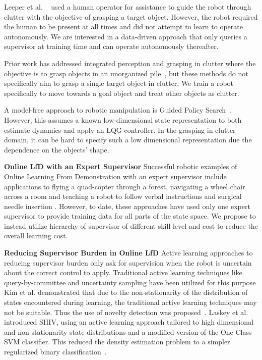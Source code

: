 \documentclass[10pt, conference]{ieeeconf}      %
\begin{document}
Leeper et al. ~\cite{leeper2012strategies} used a human operator for assistance
to guide the robot through clutter with the objective of grasping a target object. However, the robot required the human
to be present at all times and did not attempt to learn to operate autonomously. We are interested in a data-driven
approach that only queries a supervisor at training time and  can operate autonomously thereafter.

Prior work has addressed integrated perception and grasping in clutter where the objective is to
grasp objects in an unorganized pile~\cite{pinto2015supersizing,nieuwenhuisen2013mobile}, but these methods do not
specifically aim to grasp a single target object in clutter. We train a robot specifically to move towards a goal object and treat other objects as clutter. 


A model-free approach to robotic manipulation is Guided Policy Search~\cite{levine2015end}. However, this assumes a
known low-dimensional state representation to both estimate dynamics and apply an LQG controller. In the grasping in clutter
domain, it can be hard to specify such a low dimensional representation due the dependence on the objects' shape.




\noindent \textbf{Online LfD with an Expert Supervisor}
Successful robotic examples of Online Learning From Demonstration with an expert supervisor include applications to flying a quad-copter through a forest, navigating a wheel chair across a room and teaching a robot to follow verbal instructions and surgical needle insertion \cite{ross2013learning, kim2013maximum, duvallet2013imitation, laskeyshiv}. 
However, to date, these approaches have used only one expert supervisor to provide training data for all parts of the
state space. We propose to instead utilize hierarchy of supervisor of different skill level and cost to reduce the
overall learning cost. 

\noindent\textbf{Reducing Supervisor Burden in Online LfD} 
Active learning approaches to reducing supervisor burden only ask for supervision when the robot is uncertain about the
correct control to apply. Traditional active learning techniques like query-by-committee and uncertainty sampling have
been utilized for this purpose \cite{chernova2009interactive,judah2011active,grollman2007dogged}
Kim et al. demonstrated that due to the non-stationarity of the distribution of states encountered during
learning, the traditional active learning techniques may not be suitable.
Thus the use of novelty detection was proposed~\cite{kim2013maximum}. Laskey et al. introduced SHIV, using an active
learning approach tailored to high dimensional and non-stationarity state distributions and a modified version of the
One Class SVM classifier. This reduced the density estimation problem to a 
simpler regularized binary classification~\cite{laskeyshiv}. 
\end{document}
